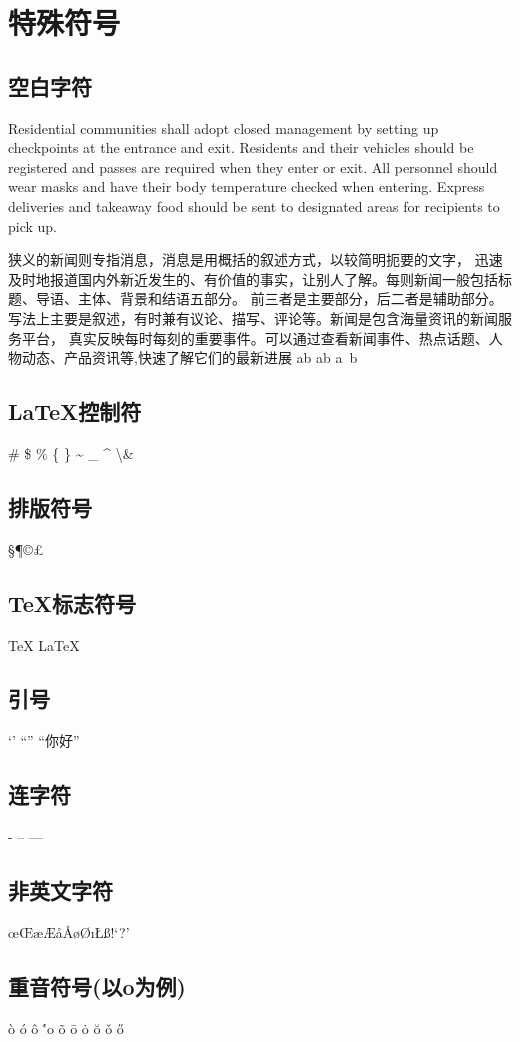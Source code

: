     \chapter{特殊符号}
    \section{空白字符}
    Residential communities shall adopt closed management 
    by setting up checkpoints at the entrance and exit. Residents and 
    their vehicles should be registered and passes are required when they 
    enter or exit. All personnel should wear masks and have their body 
    temperature checked when entering. Express deliveries and takeaway food 
    should be sent to designated areas for recipients to pick up.


    狭\quad 义的新闻则专指消息，消息是用概括的叙述方式，以较简明扼要的文字，
    迅速及时地报道国内外新近发生的、有价值的事实，让别人了解。每则新闻一般包括标题、导语、主体、背景和结语五部分。
    前三者是主要部分，后二者是辅助部分。写法上主要是叙述，有时兼有议论、描写、评论等。新闻是包含海量资讯的新闻服务平台，
    真实反映每时每刻的重要事件。可以通过查看新闻事件、热点话题、人物动态、产品资讯等,快速了解它们的最新进展
    a\quad b
    a\qquad b
    a~b

    \section{\LaTeX 控制符}
    \# \$ \% \{ \} \~{} \_{} \^{} \textbackslash \&

    \section{排版符号}
    \S \P \dag \ddag \copyright \pounds

    \section{\TeX 标志符号}
    \TeX{} \LaTeX{} \LaTeXe{}
    \XeLaTeX


    \section{引号}
    `' ``''  ``你好''

    \section{连字符}
    - -- ---

    \section{非英文字符}
    \oe \OE \ae \AE \aa \AA \o \O \i \L \SS \ss !`?'

    \section{重音符号(以o为例)}
    \`o \'o  \^o \''o \~o \=o \.o \u{o} \v{o} \H{o}